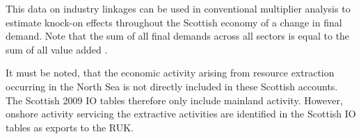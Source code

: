 \bigskip

This data on industry linkages can be used in conventional multiplier analysis to estimate knock-on effects throughout the Scottish economy of a change in final demand. Note that the sum of all final demands across all sectors is equal to the sum of all value added \cite{ScottishGovernment2011a}.

\newpage

It must be noted, that the economic activity arising from resource extraction occurring in the North Sea is not directly included in these Scottish accounts. The Scottish 2009 IO tables therefore only include mainland activity. However, onshore activity servicing the extractive activities are identified in the Scottish IO tables as exports to the RUK.        

\bigskip

